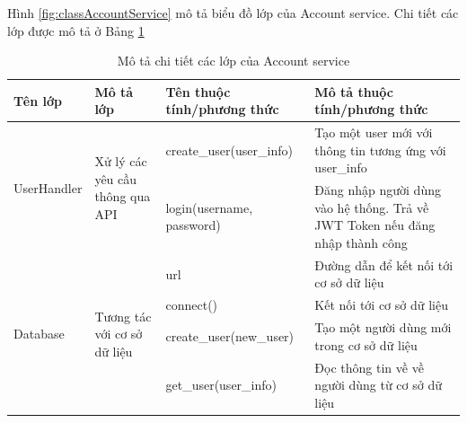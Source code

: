 \documentclass[../DoAn.tex]{subfiles}
\begin{document}
Hình \ref{fig:classAccountService} mô tả biểu đồ lớp của Account service. Chi
tiết các lớp được mô tả ở Bảng \ref{tab:classAccountService}

\begin{longtable}{|p{}|p{}|p{}|p{}|}
    \caption{Mô tả chi tiết các lớp của Account service}
    \label{tab:classAccountService}                                                                                                                                                                                           \\
    \hline
    Tên lớp                                     & Mô tả lớp                                                       & Tên thuộc tính/phương thức & Mô tả thuộc tính/phương thức                                                 \\ \hline
    \multirow[t]{2}{0.2\textwidth}{UserHandler} & \multirow[t]{2}{0.2\textwidth}{Xử lý các yêu cầu thông qua API} & create\_user(user\_info)   & Tạo một user mới với thông tin tương ứng với user\_info                      \\ \hline
                                                &                                                                 & login(username, password)  & Đăng nhập người dùng vào hệ thống. Trả về JWT Token nếu đăng nhập thành công \\ \hline
    \multirow[t]{4}{0.2\textwidth}{Database}    & \multirow[t]{4}{0.2\textwidth}{Tương tác với cơ sở dữ liệu}     & url                        & Đường dẫn để kết nối tới cơ sở dữ liệu                                       \\ \cline{3-4}
                                                &                                                                 & connect()                  & Kết nối tới cơ sở dữ liệu                                                    \\ \cline{3-4}
                                                &                                                                 & create\_user(new\_user)    & Tạo một người dùng mới trong cơ sở dữ liệu                                   \\ \cline{3-4}
                                                &                                                                 & get\_user(user\_info)      & Đọc thông tin về về người dùng từ cơ sở dữ liệu                              \\ \hline
\end{longtable}
\end{document}
